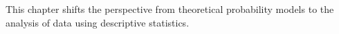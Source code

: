This chapter shifts the perspective from theoretical probability models to the analysis of data using descriptive statistics.
